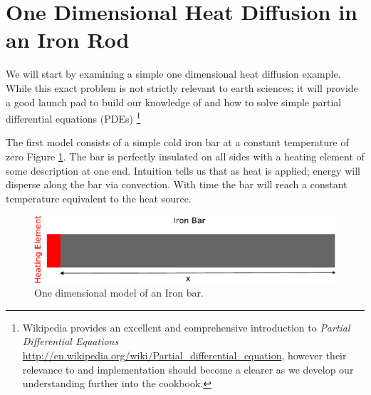 
%
%
%

\section{One Dimensional Heat Diffusion in an Iron Rod}
We will start by examining a simple one dimensional heat diffusion example. While this exact problem is not strictly relevant to earth sciences; it will provide a good launch pad to build our knowledge of \ESCRIPT and how to solve simple partial differential equations (PDEs) 
\footnote{Wikipedia provides an excellent and comprehensive introduction to \textit{Partial Differential Equations} \url{http://en.wikipedia.org/wiki/Partial_differential_equation}, however their relevance to \ESCRIPT and implementation should become a clearer as we develop our understanding further into the cookbook.}

The first model consists of a simple cold iron bar at a constant temperature of zero Figure \ref{fig:onedhdmodel}. The bar is perfectly insulated on all sides with a heating element of some description at one end. Intuition tells us that as heat is applied; energy will disperse along the bar via convection. With time the bar will reach a constant temperature equivalent to the heat source.
\begin{figure}[h!]
\centerline{\includegraphics[width=4.in]{figures/onedheatdiff}}
\caption{One dimensional model of an Iron bar.}
\label{fig:onedhdmodel}
\end{figure}

